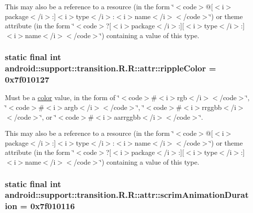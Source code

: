 This may also be a reference to a resource (in the form \char`\"{}$<$code$>$@\mbox{[}$<$i$>$package$<$/i$>$:\mbox{]}$<$i$>$type$<$/i$>$:$<$i$>$name$<$/i$>$$<$/code$>$\char`\"{}) or theme attribute (in the form \char`\"{}$<$code$>$?\mbox{[}$<$i$>$package$<$/i$>$:\mbox{]}\mbox{[}$<$i$>$type$<$/i$>$:\mbox{]}$<$i$>$name$<$/i$>$$<$/code$>$\char`\"{}) containing a value of this type. \hypertarget{classandroid_1_1support_1_1transition_1_1_r_1_1attr_ca51c8b68799ba98e06641f20f7a3a78}{
\subsubsection[{rippleColor}]{\setlength{\rightskip}{0pt plus 5cm}static final int android::support::transition.R.R::attr::rippleColor = 0x7f010127}}
\label{classandroid_1_1support_1_1transition_1_1_r_1_1attr_ca51c8b68799ba98e06641f20f7a3a78}


Must be a \hyperlink{classandroid_1_1support_1_1transition_1_1_r_1_1color}{color} value, in the form of \char`\"{}$<$code$>$\#$<$i$>$rgb$<$/i$>$$<$/code$>$\char`\"{}, \char`\"{}$<$code$>$\#$<$i$>$argb$<$/i$>$$<$/code$>$\char`\"{}, \char`\"{}$<$code$>$\#$<$i$>$rrggbb$<$/i$>$$<$/code$>$\char`\"{}, or \char`\"{}$<$code$>$\#$<$i$>$aarrggbb$<$/i$>$$<$/code$>$\char`\"{}. 

This may also be a reference to a resource (in the form \char`\"{}$<$code$>$@\mbox{[}$<$i$>$package$<$/i$>$:\mbox{]}$<$i$>$type$<$/i$>$:$<$i$>$name$<$/i$>$$<$/code$>$\char`\"{}) or theme attribute (in the form \char`\"{}$<$code$>$?\mbox{[}$<$i$>$package$<$/i$>$:\mbox{]}\mbox{[}$<$i$>$type$<$/i$>$:\mbox{]}$<$i$>$name$<$/i$>$$<$/code$>$\char`\"{}) containing a value of this type. \hypertarget{classandroid_1_1support_1_1transition_1_1_r_1_1attr_a44f2adb01cc1ecc7b9d0567160fa0d5}{
\subsubsection[{scrimAnimationDuration}]{\setlength{\rightskip}{0pt plus 5cm}static final int android::support::transition.R.R::attr::scrimAnimationDuration = 0x7f010116}}
\label{classandroid_1_1support_1_1transition_1_1_r_1_1attr_a44f2adb01cc1ecc7b9d0567160fa0d5}


